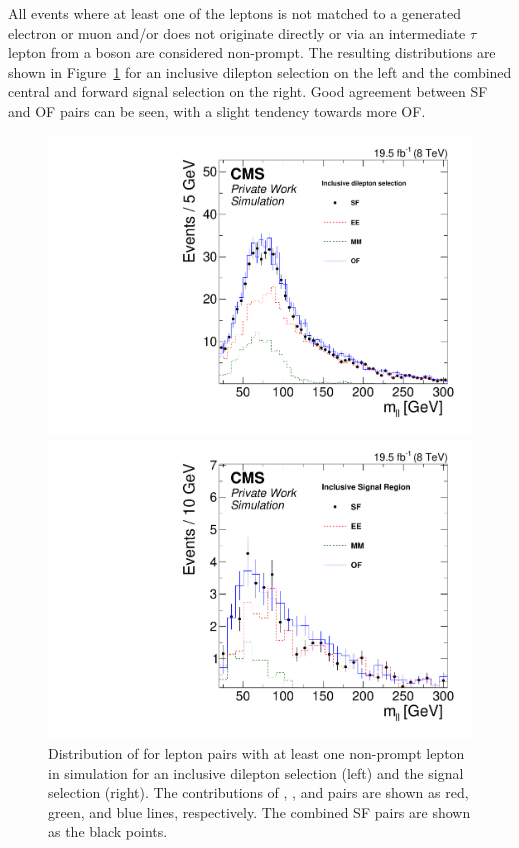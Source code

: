 All events where at least one of the leptons is not matched to a generated electron or muon and/or does not originate directly or via an intermediate $\tau$ lepton from a \W boson are considered non-prompt. The resulting \mll distributions are shown in Figure~\ref{fig:nonPromptMC} for an inclusive dilepton selection on the left and the combined central and forward signal selection on the right. Good agreement between SF and OF pairs can be seen, with a slight tendency towards more OF. 
\begin{figure}[htbp]
\centering
\begin{minipage}[t]{0.49\textwidth}
  \includegraphics[width=\textwidth]{plots/BG/nonPrompt/nonPromptMC_Inclusive_Full2012_Mll_None.pdf}
\end{minipage}
\begin{minipage}[t]{0.49\textwidth}
\includegraphics[width=\textwidth]{plots/BG/nonPrompt/nonPromptMC_SignalInclusive_Full2012_Mll_None.pdf}
\end{minipage}
\caption{Distribution of \mll for lepton pairs with at least one non-prompt lepton in simulation for an inclusive dilepton selection (left) and the signal selection (right). The contributions of \EE, \MM, and \EM pairs are shown as red, green, and blue lines, respectively. The combined SF pairs are shown as the black points.}
\label{fig:nonPromptMC}
\end{figure} 
